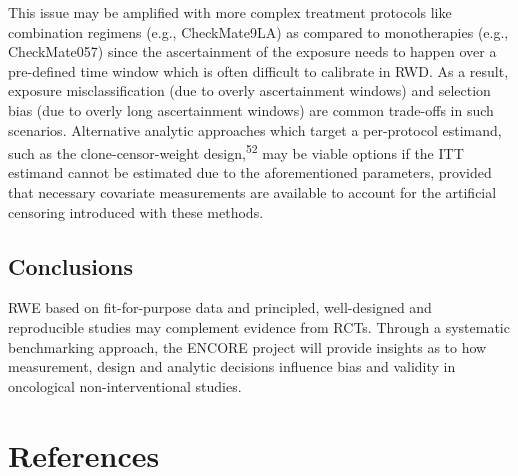\documentclass[
  letterpaper,
  DIV=11,
  numbers=noendperiod]{scrartcl}
\begin{document}
This issue may be amplified with more complex treatment protocols like
combination regimens (e.g., CheckMate9LA) as compared to monotherapies
(e.g., CheckMate057) since the ascertainment of the exposure needs to
happen over a pre-defined time window which is often difficult to
calibrate in RWD. As a result, exposure misclassification (due to overly
ascertainment windows) and selection bias (due to overly long
ascertainment windows) are common trade-offs in such scenarios.
Alternative analytic approaches which target a per-protocol estimand,
such as the clone-censor-weight design,\textsuperscript{52} may be
viable options if the ITT estimand cannot be estimated due to the
aforementioned parameters, provided that necessary covariate
measurements are available to account for the artificial censoring
introduced with these methods.

\subsection{Conclusions}\label{conclusions}

RWE based on fit-for-purpose data and principled, well-designed and
reproducible studies may complement evidence from RCTs. Through a
systematic benchmarking approach, the ENCORE project will provide
insights as to how measurement, design and analytic decisions influence
bias and validity in oncological non-interventional studies.

\newpage{}

\section*{References}\label{references}
\end{document}
